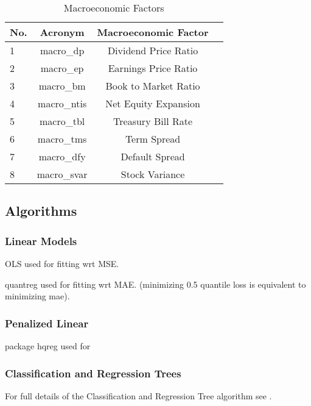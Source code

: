 \documentclass[a4paper, table]{article}
\begin{document}
\begin{table}
	\caption{Macroeconomic Factors}
	\begin{center}
	\begin{tabular}{lccc} \hline \hline
		No. & Acronym & Macroeconomic Factor \\ \hline \hline
		1 & macro\_dp & Dividend Price Ratio \\
		2 & macro\_ep & Earnings Price Ratio \\
		3 & macro\_bm & Book to Market Ratio \\
		4 & macro\_ntis & Net Equity Expansion \\
		5 & macro\_tbl & Treasury Bill Rate \\
		6 & macro\_tms & Term Spread \\
		7 & macro\_dfy & Default Spread \\
		8 & macro\_svar & Stock Variance \\
	\end{tabular}
	\end{center}
\end{table}

\subsection{Algorithms}
\label{Algorithms}

\subsubsection{Linear Models}

OLS used for fitting wrt MSE.

quantreg used for fitting wrt MAE. (minimizing 0.5 quantile loss is equivalent to minimizing mae).

\subsubsection{Penalized Linear}

package hqreg used for

\subsubsection{Classification and Regression Trees}

For full details of the Classification and Regression Tree algorithm see \cite{breiman_classification_1984}. 
\end{document}
